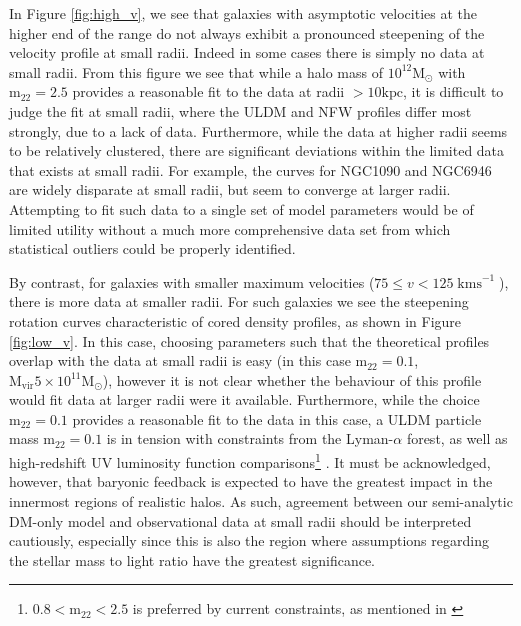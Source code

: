 \documentclass{pasa}%
\begin{document}
In Figure \ref{fig:high_v}, we see that galaxies with asymptotic velocities at the higher end of the range do not always exhibit a pronounced steepening of the velocity profile at small radii. Indeed in some cases there is simply no data at small radii. From this figure we see that while a halo mass of $10^{12} \mathrm{M}_{\odot}$ with $\mathrm{m_{22}} = 2.5$ provides a reasonable fit to the data at radii $>10 \mathrm{kpc}$, it is difficult to judge the fit at small radii, where the ULDM and NFW profiles differ most strongly, due to a lack of data. Furthermore, while the data at higher radii seems to be relatively clustered, there are significant deviations within the limited data that exists at small radii. For example, the curves for NGC1090 and NGC6946 are widely disparate at small radii, but seem to converge at larger radii. Attempting to fit such data to a single set of model parameters would be of limited utility without a much more comprehensive data set from which statistical outliers could be properly identified.  

By contrast, for galaxies with smaller maximum velocities ($75 \leq v < 125\operatorname{kms}^{-1}$), there is more data at smaller radii. For such galaxies we see the steepening rotation curves characteristic of cored density profiles, as shown in Figure \ref{fig:low_v}. In this case, choosing parameters such that the theoretical profiles overlap with the data at small radii is easy (in this case $\mathrm{m_{22}} = 0.1$, $\mathrm{M}_{\mathrm{vir}}5\times10^{11} \mathrm{M}_{\odot}$), however it is not clear whether the behaviour of this profile would fit data at larger radii were it available. Furthermore, while the choice $\mathrm{m_{22}} = 0.1$ provides a reasonable fit to the data in this case, a ULDM particle mass $\mathrm{m_{22}} = 0.1$ is in tension with constraints from the Lyman-$\alpha$ forest, as well as high-redshift UV luminosity function comparisons\footnote{$ 0.8 < \mathrm{m_{22}} < 2.5$ is preferred by current constraints, as mentioned in \cite{Robles:2018fur}} \cite{Amendola:2005ad, Bozek:2014uqa, Armengaud:2017nkf, Ni:2019qfa, Nebrin:2018vqt}. It must be acknowledged, however, that baryonic feedback is expected to have the greatest impact in the innermost regions of realistic halos. As such, agreement between our semi-analytic DM-only model and observational data at small radii should be interpreted cautiously, especially since this is also the region where assumptions regarding the stellar mass to light ratio have the greatest significance.  
\end{document}
